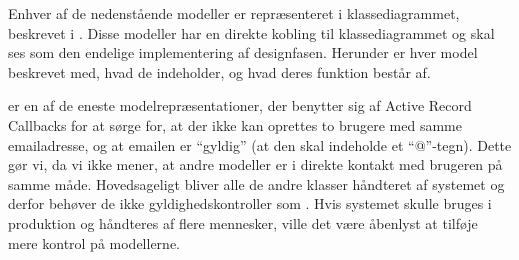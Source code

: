 Enhver af de nedenstående modeller er repræsenteret i klassediagrammet, beskrevet i . Disse modeller har en direkte kobling til klassediagrammet og skal ses som den endelige implementering af designfasen. Herunder er hver model beskrevet med, hvad de indeholder, og hvad deres funktion består af.

 er en af de eneste modelrepræsentationer, der benytter sig af Active Record Callbacks for at sørge for, at der \fx ikke kan oprettes to brugere med samme emailadresse, og at emailen er ``gyldig'' (\fx at den skal indeholde et ``@''-tegn). Dette gør vi, da vi ikke mener, at andre modeller er i direkte kontakt med brugeren på samme måde. Hovedsageligt bliver alle de andre klasser håndteret af systemet og derfor behøver de \fx ikke gyldighedskontroller som . Hvis systemet skulle bruges i produktion og håndteres af flere mennesker, ville det være åbenlyst at tilføje mere kontrol på modellerne.

